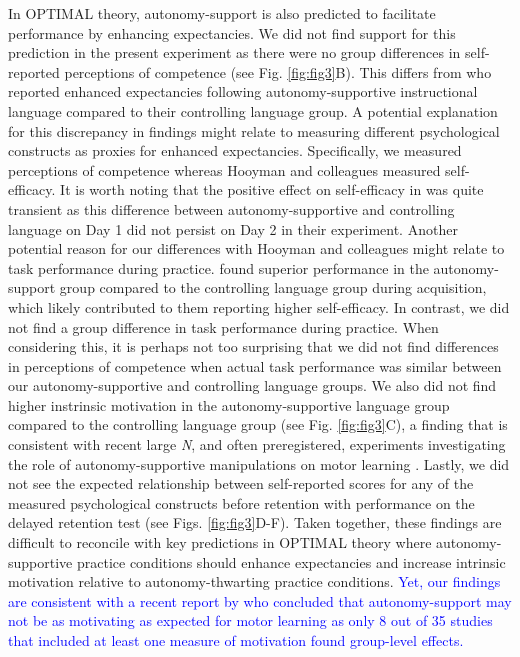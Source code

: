 \documentclass[man,floatsintext,donotrepeattitle,letterpaper,12pt]{apa7}
\begin{document}
In OPTIMAL theory, autonomy-support is also predicted to facilitate performance by enhancing expectancies. We did not find support for this prediction in the present experiment as there were no group differences in self-reported perceptions of competence (see Fig. \ref{fig:fig3}B). This differs from \textcite{hooyman2014} who reported enhanced expectancies following autonomy-supportive instructional language compared to their controlling language group. A potential explanation for this discrepancy in findings might relate to measuring different psychological constructs as proxies for enhanced expectancies. Specifically, we measured perceptions of competence whereas Hooyman and colleagues measured self-efficacy. It is worth noting that the positive effect on self-efficacy in \textcite{hooyman2014} was quite transient as this difference between autonomy-supportive and controlling language on Day 1 did not persist on Day 2 in their experiment. Another potential reason for our differences with Hooyman and colleagues might relate to task performance during practice. \textcite{hooyman2014} found superior performance in the autonomy-support group compared to the controlling language group during acquisition, which likely contributed to them reporting higher self-efficacy. In contrast, we did not find a group difference in task performance during practice. When considering this, it is perhaps not too surprising that we did not find differences in perceptions of competence when actual task performance was similar between our autonomy-supportive and controlling language groups. We also did not find higher instrinsic motivation in the autonomy-supportive language group compared to the controlling language group (see Fig. \ref{fig:fig3}C), a finding that is consistent with recent large \emph{N}, and often preregistered, experiments investigating the role of autonomy-supportive manipulations on motor learning \autocite[e.g.,][]{bacelar2022,stgermain2022,stgermain2023}. Lastly, we did not see the expected relationship between self-reported scores for any of the measured psychological constructs before retention with performance on the delayed retention test (see Figs. \ref{fig:fig3}D-F). Taken together, these findings are difficult to reconcile with key predictions in OPTIMAL theory \autocite{wulf2016} where autonomy-supportive practice conditions should enhance expectancies and increase intrinsic motivation relative to autonomy-thwarting practice conditions. \textcolor{blue}{Yet, our findings are consistent with a recent report by \textcite{parma2024} who concluded that autonomy-support may not be as motivating as expected for motor learning as only 8 out of 35 studies\footnotemark{} that included at least one measure of motivation found group-level effects.}
\end{document}
